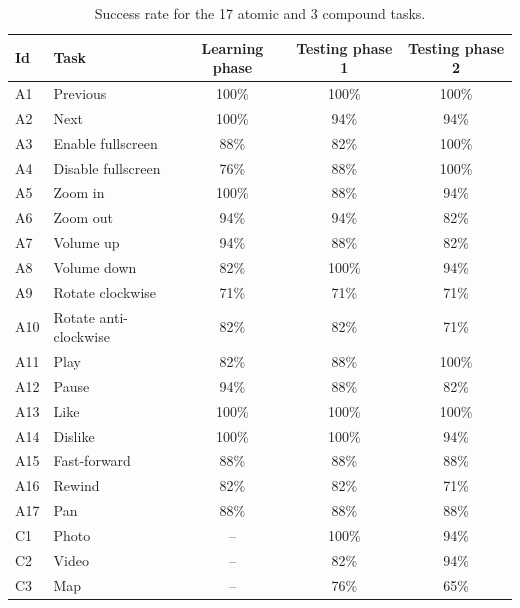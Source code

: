 \begin{table}[!hbt]
    \renewcommand{\arraystretch}{1.1}
    \footnotesize
    \centering
    \begin{tabular}{lp{3.45cm}ccc}
        \toprule
        \textbf{Id} & \textbf{Task} & \textbf{Learning phase} & \textbf{Testing phase 1} & \textbf{Testing phase 2} \\
        \midrule
        A1 & Previous & 100\% & 100\% & 100\%  \\ 
        A2 & Next & 100\% & 94\% & 94\%  \\ 
        A3 & Enable fullscreen & 88\% & 82\% & 100\%  \\ 
        A4 & Disable fullscreen & 76\% & 88\% & 100\%  \\ 
        A5 & Zoom in & 100\% & 88\% & 94\%  \\ 
        A6 & Zoom out & 94\% & 94\% & 82\%  \\ 
        A7 & Volume up & 94\% & 88\% & 82\%  \\ 
        A8 & Volume down & 82\% & 100\% & 94\%  \\ 
        A9 & Rotate clockwise & 71\% & 71\% & 71\%  \\ 
        A10 & Rotate anti-clockwise & 82\% & 82\% & 71\%  \\ 
        A11 & Play & 82\% & 88\% & 100\%  \\ 
        A12 & Pause & 94\% & 88\% & 82\%  \\ 
        A13 & Like & 100\% & 100\% & 100\%  \\ 
        A14 & Dislike & 100\% & 100\% & 94\%  \\ 
        A15 & Fast-forward & 88\% & 88\% & 88\%  \\ 
        A16 & Rewind & 82\% & 82\% & 71\%  \\ 
        A17 & Pan & 88\% & 88\% & 88\%  \\ 
        \midrule
        C1 & Photo & -- & 100\% & 94\%  \\ 
        C2 & Video & -- & 82\% & 94\%  \\ 
        C3 & Map & -- & 76\% & 65\% \\ 
        \bottomrule
    \end{tabular}
    \vspace{-4pt}
    \caption{Success rate for the 17 atomic and 3 compound tasks.}
	\label{tab:lui:success-rate}
\end{table}

